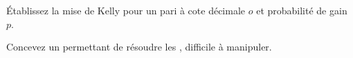 \begin{interviewq}\label{iq:m3:prediction-and-betting-markets:5}
Établissez la mise de Kelly pour un pari à cote décimale $o$ et probabilité de gain $p$.
\end{interviewq}

\begin{interviewq}\label{iq:m3:prediction-and-betting-markets:6}
Concevez un  permettant de résoudre les , difficile à manipuler.
\end{interviewq}

